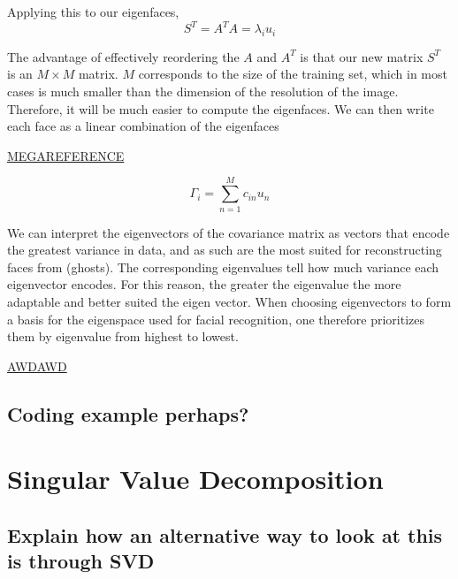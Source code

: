 \documentclass[12pt]{report}
\begin{document}
            Applying this to our eigenfaces,
                \[
                    S^T = A^T A = \lambda_i u_i
                \]
    
            The advantage of effectively reordering the $A$ and $A^T$ is that our new matrix $S^T$ is an $M \times M$ matrix. $M$ corresponds to the size of the training set, which in most cases is much smaller than the dimension of the resolution of the image. Therefore, it will be much easier to compute the eigenfaces. We can then write each face as a linear combination of the eigenfaces
            
            \href{https://datascienceplus.com/understanding-the-covariance-matrix/}{MEGAREFERENCE}
            
            \[
                \Gamma_i = \sum_{n=1}^M c_{in} u_{n}
            \]
    
            We can interpret the eigenvectors of the covariance matrix as vectors that encode the greatest variance in data, and as such are the most suited for reconstructing faces from (ghosts). The corresponding eigenvalues tell how much variance each eigenvector encodes. For this reason, the greater the eigenvalue the more adaptable and better suited the eigen vector. When choosing eigenvectors to form a basis for the eigenspace used for facial recognition, one therefore prioritizes them by eigenvalue from highest to lowest.
            
            \href{http://math.clarku.edu/\textasciitilde djoyce/ma217/covar.pdf}{AWDAWD}
    
    \section{Coding example perhaps?}
    \blindtext
    
    \chapter{Singular Value Decomposition}
    \section{Explain how an alternative way to look at this is through SVD}
    
\end{document}
